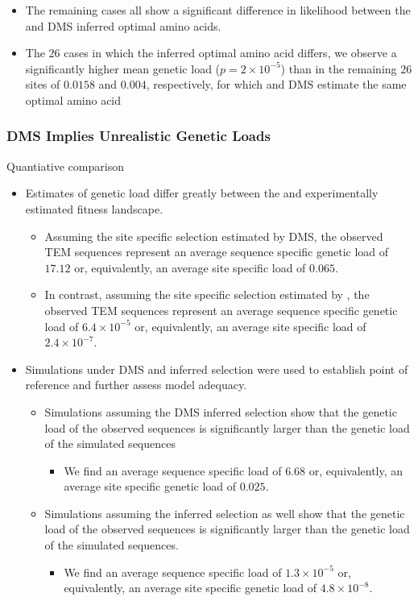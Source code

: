 \documentclass[12pt]{article}
\begin{document}
\begin{itemize}
\begin{itemize}
\begin{itemize}
\begin{itemize}
			\item The remaining cases all show a significant difference in likelihood between the \selac and DMS inferred optimal amino acids.
			\item The $26$ cases in which the inferred optimal amino acid differs, we observe a significantly higher mean genetic load ($p = 2\times10^{-5}$) than in the remaining $26$ sites of $0.0158$ and $0.004$, respectively, for which \selac and DMS estimate the same optimal amino acid
		\end{itemize}
	\end{itemize}
\end{itemize}

\subsubsection*{DMS Implies Unrealistic Genetic Loads}
Quantiative comparison
\begin{itemize}
	\item Estimates of genetic load differ greatly between the \selac and experimentally estimated fitness landscape.
	\begin{itemize}
		\item Assuming the site specific selection estimated by DMS, the observed TEM sequences represent an average sequence specific genetic load of $17.12$ or, equivalently, an average site specific load of $0.065$.
		\item In contrast, assuming the site specific selection estimated by \selac, the observed TEM sequences represent an average sequence specific genetic load of $6.4\times10^{-5}$ or, equivalently, an average site specific load of $2.4\times10^{-7}$.
	\end{itemize}
	\item Simulations under DMS and \selac inferred selection were used to establish point of reference and further assess model adequacy.
	\begin{itemize}
		\item Simulations assuming the DMS inferred selection show that the genetic load of the observed sequences is significantly larger than the genetic load of the simulated sequences
		\begin{itemize}
			\item We find an average sequence specific load of $6.68$ or, equivalently, an average site specific genetic load of $0.025$.
		\end{itemize}
		\item Simulations assuming the \selac inferred selection as well show that the genetic load of the observed sequences is significantly larger than the genetic load of the simulated sequences.
		\begin{itemize}
			\item We find an average sequence specific load of $1.3\times10^{-5}$ or, equivalently, an average site specific genetic load of $4.8\times 10^{-8}$.
		\end{itemize}
	\end{itemize}
\end{itemize}



\end{itemize}
\end{document}
